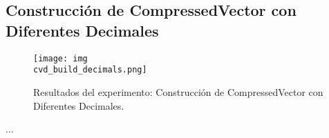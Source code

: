 \subsection{Construcción de CompressedVector con Diferentes Decimales}
\label{exp:cvd-build-decimals}

\begin{figure}[H]
    \centering
    \texttt{[image: img\\cvd\_build\_decimals.png]}
    \caption{Resultados del experimento: Construcción de CompressedVector con Diferentes Decimales.}
    \label{fig:cvd-build-decimals}
\end{figure}

...
